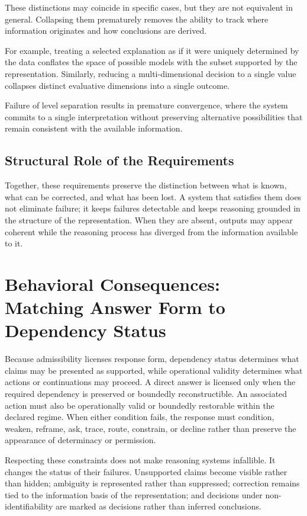 \documentclass[11pt]{article}
\begin{document}
These distinctions may coincide in specific cases, but they are not equivalent in general. Collapsing them prematurely removes the ability to track where information originates and how conclusions are derived.

For example, treating a selected explanation as if it were uniquely determined by the data conflates the space of possible models with the subset supported by the representation. Similarly, reducing a multi-dimensional decision to a single value collapses distinct evaluative dimensions into a single outcome.

Failure of level separation results in premature convergence, where the system commits to a single interpretation without preserving alternative possibilities that remain consistent with the available information.

\subsection{Structural Role of the Requirements}

Together, these requirements preserve the distinction between what is known, what can be corrected, and what has been lost. A system that satisfies them does not eliminate failure; it keeps failures detectable and keeps reasoning grounded in the structure of the representation. When they are absent, outputs may appear coherent while the reasoning process has diverged from the information available to it.

\section{Behavioral Consequences: Matching Answer Form to Dependency Status}

Because admissibility licenses response form, dependency status determines what claims may be presented as supported, while operational validity determines what actions or continuations may proceed. A direct answer is licensed only when the required dependency is preserved or boundedly reconstructible. An associated action must also be operationally valid or boundedly restorable within the declared regime. When either condition fails, the response must condition, weaken, reframe, ask, trace, route, constrain, or decline rather than preserve the appearance of determinacy or permission.

Respecting these constraints does not make reasoning systems infallible. It changes the status of their failures. Unsupported claims become visible rather than hidden; ambiguity is represented rather than suppressed; correction remains tied to the information basis of the representation; and decisions under non-identifiability are marked as decisions rather than inferred conclusions.
\end{document}
